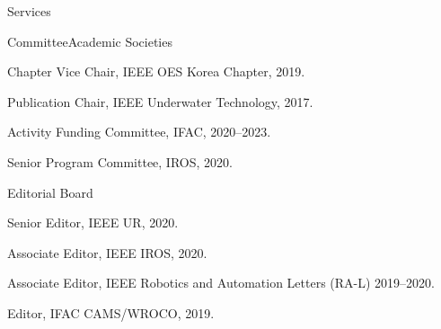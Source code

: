 \begin{rSection}{Services}

\begin{rSubsection}{Committee}{}{Academic Societies}{}

  \item Chapter Vice Chair, IEEE OES Korea Chapter, 2019.


  \item Publication Chair, IEEE Underwater Technology, 2017.

  \item Activity Funding Committee, IFAC, 2020--2023.
  \item Senior Program Committee, IROS, 2020.
\end{rSubsection}

%

\begin{rSubsection}{Editorial Board}{}{}{}
  \item Senior Editor, IEEE UR, 2020.
  \item Associate Editor, IEEE IROS, 2020.
  \item Associate Editor, IEEE Robotics and Automation Letters (RA-L) 2019--2020.
  \item Editor, IFAC CAMS/WROCO, 2019.
\end{rSubsection}


\end{rSection}
